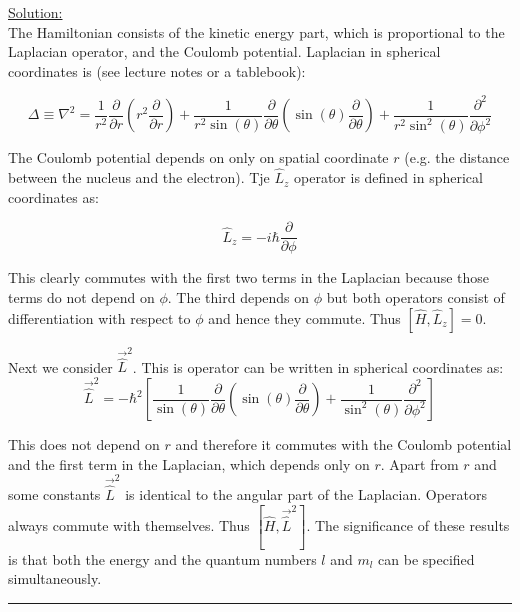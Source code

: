 \noindent
\underline{Solution:}\\

The Hamiltonian consists of the kinetic energy part, which is proportional to the Laplacian operator, and the Coulomb potential.
Laplacian in spherical coordinates is (see lecture notes or a tablebook):

$$\Delta\equiv \nabla^2 = \frac{1}{r^2}\frac{\partial}{\partial r}\left(r^2\frac{\partial}{\partial r}\right) + \frac{1}{r^2\sin(\theta)}\frac{\partial}{\partial\theta}\left(\sin(\theta)\frac{\partial}{\partial\theta}\right)
+ \frac{1}{r^2\sin^2(\theta)}\frac{\partial^2}{\partial\phi^2}$$

The Coulomb potential depends on only on spatial coordinate $r$ (e.g. the distance between the nucleus and the electron). Tje $\hat{L}_z$ operator is defined in spherical coordinates as:

$$\hat{L}_z = -i\hbar\frac{\partial}{\partial\phi}$$

This clearly commutes with the first two terms in the Laplacian because those terms do not depend on $\phi$. The third depends on $\phi$ but both operators consist of differentiation with respect to $\phi$ and hence they commute. Thus $\left[\hat{H},\hat{L}_z\right] = 0$.

Next we consider $\vec{\hat{L}}^2$. This is operator can be written in spherical coordinates as:
$$\vec{\hat{L}}^2 = -\hbar^2\left[\frac{1}{\sin(\theta)}\frac{\partial}{\partial\theta}\left(\sin(\theta)\frac{\partial}{\partial\theta}\right) + \frac{1}{\sin^2(\theta)}\frac{\partial^2}{\partial\phi^2}\right]$$

This does not depend on $r$ and therefore it commutes with the Coulomb potential and the first term in the Laplacian, which depends only on $r$. Apart from $r$ and some constants $\vec{\hat{L}}^2$ is identical to the angular part of the Laplacian. Operators always commute with themselves. Thus $\left[\hat{H},\vec{\hat{L}}^2\right]$. The significance of these results is that both the energy and the quantum numbers $l$ and $m_l$ can be specified simultaneously.

\hrule\vspace{0.5cm}

